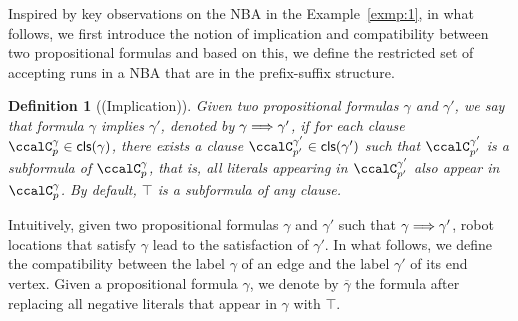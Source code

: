\documentclass[Afour,sageh,times]{sagej}
\newtheorem{defn}[thm]{Definition}
\newcommand{\clause}[1]{\mathsf{cls}(#1)}
\newcommand{\simplies}{\DOTSB\Longrightarrow}
\begin{document}
 Inspired by key observations on the NBA in the Example~\ref{exmp:1}, in what follows, we first introduce the notion of implication and compatibility between two propositional formulas and based on this, we define the restricted set of accepting runs in a NBA that are in the prefix-suffix structure.
 \begin{defn}[(Implication)]\label{defn:implication}
Given two propositional formulas $\gamma$ and $\gamma'$, we say that formula  $\gamma$ implies $\gamma'$, denoted by $\gamma \simplies \gamma'$, if for each clause $\ccalC_{p}^{\gamma} \in \clause{\gamma}$, there exists a clause $\ccalC_{p'}^{\gamma'} \in \clause{\gamma'}$ such that  $\ccalC_{p'}^{\gamma'}$ is a subformula of $\ccalC_{p}^{\gamma}$, that is, all literals appearing in $\ccalC_{p'}^{\gamma'}$ also appear in $\ccalC_{p}^{\gamma}$. By default, $\top$ is a subformula of any clause. %
 \end{defn}

 Intuitively, given two propositional formulas $\gamma$ and $\gamma'$ such that $\gamma \simplies \gamma'$, robot locations that satisfy $\gamma$ lead to the satisfaction of $\gamma'$. In what follows, we define the compatibility between the label $\gamma$ of an edge  and the  label $\gamma'$ of its end vertex. Given a propositional formula $\gamma$, we denote by $\overline{\gamma}$ the formula  after replacing all negative literals that appear in $\gamma$ with $\top$.
\end{document}

